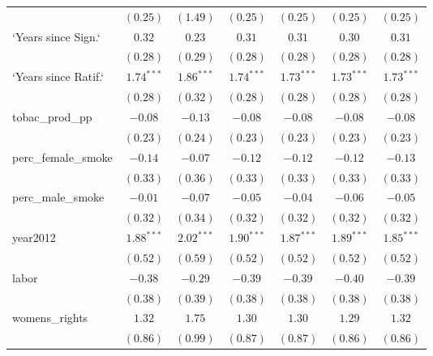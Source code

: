 \begin{table}[!h]
\begin{center}
\begin{tabular}{l c c c c c c }
                        & $(0.25)$     & $(1.49)$     & $(0.25)$     & $(0.25)$     & $(0.25)$     & $(0.25)$     \\
`Years since Sign.`     & $0.32$       & $0.23$       & $0.31$       & $0.31$       & $0.30$       & $0.31$       \\
                        & $(0.28)$     & $(0.29)$     & $(0.28)$     & $(0.28)$     & $(0.28)$     & $(0.28)$     \\
`Years since Ratif.`    & $1.74^{***}$ & $1.86^{***}$ & $1.74^{***}$ & $1.73^{***}$ & $1.73^{***}$ & $1.73^{***}$ \\
                        & $(0.28)$     & $(0.32)$     & $(0.28)$     & $(0.28)$     & $(0.28)$     & $(0.28)$     \\
tobac\_prod\_pp         & $-0.08$      & $-0.13$      & $-0.08$      & $-0.08$      & $-0.08$      & $-0.08$      \\
                        & $(0.23)$     & $(0.24)$     & $(0.23)$     & $(0.23)$     & $(0.23)$     & $(0.23)$     \\
perc\_female\_smoke     & $-0.14$      & $-0.07$      & $-0.12$      & $-0.12$      & $-0.12$      & $-0.13$      \\
                        & $(0.33)$     & $(0.36)$     & $(0.33)$     & $(0.33)$     & $(0.33)$     & $(0.33)$     \\
perc\_male\_smoke       & $-0.01$      & $-0.07$      & $-0.05$      & $-0.04$      & $-0.06$      & $-0.05$      \\
                        & $(0.32)$     & $(0.34)$     & $(0.32)$     & $(0.32)$     & $(0.32)$     & $(0.32)$     \\
year2012                & $1.88^{***}$ & $2.02^{***}$ & $1.90^{***}$ & $1.87^{***}$ & $1.89^{***}$ & $1.85^{***}$ \\
                        & $(0.52)$     & $(0.59)$     & $(0.52)$     & $(0.52)$     & $(0.52)$     & $(0.52)$     \\
labor                   & $-0.38$      & $-0.29$      & $-0.39$      & $-0.39$      & $-0.40$      & $-0.39$      \\
                        & $(0.38)$     & $(0.39)$     & $(0.38)$     & $(0.38)$     & $(0.38)$     & $(0.38)$     \\
womens\_rights          & $1.32$       & $1.75$       & $1.30$       & $1.30$       & $1.29$       & $1.32$       \\
                        & $(0.86)$     & $(0.99)$     & $(0.87)$     & $(0.87)$     & $(0.86)$     & $(0.86)$     \\

\end{tabular}
\end{center}
\end{table}
